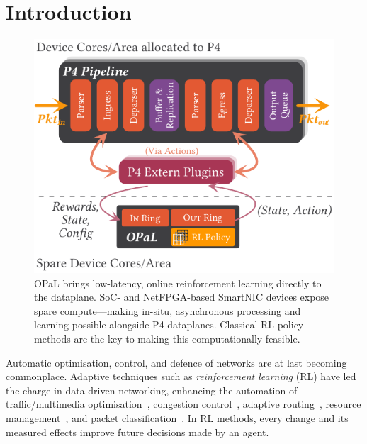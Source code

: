 \documentclass[sigconf,natbib=false]{acmart}
\newcommand{\approachshort}{OPaL}
\begin{document}
\section{Introduction}
\begin{figure}
	\centering
	\includegraphics[keepaspectratio, width=0.9\linewidth]{figures/arch-with-p4}
	\caption{\approachshort{} brings low-latency, online reinforcement learning directly to the dataplane. SoC- and NetFPGA-based SmartNIC devices expose spare compute---making in-situ, asynchronous processing and learning possible alongside P4 dataplanes. Classical RL policy methods are the key to making this computationally feasible.\label{fig:netro-arch}}
\end{figure}
Automatic optimisation, control, and defence of networks are at last becoming commonplace.
Adaptive techniques such as \emph{reinforcement learning} (RL) have led the charge in data-driven networking, enhancing the automation of traffic/multimedia optimisation~\parencite{DBLP:conf/sigcomm/ChenL0L18,DBLP:conf/sigcomm/MaoNA17}, congestion control~\parencite{DBLP:journals/corr/abs-1910-04054}, adaptive routing~\parencite{DBLP:conf/hotnets/ValadarskySST17}, resource management~\parencite{DBLP:conf/hotnets/MaoAMK16}, and packet classification~\parencite{DBLP:conf/sigcomm/LiangZJS19}.
In RL methods, every change and its measured effects improve future decisions made by an agent.
\end{document}
